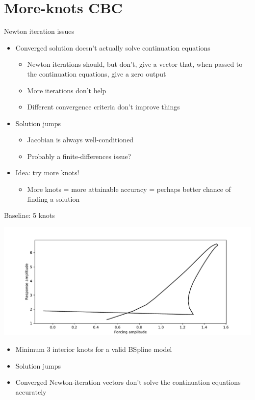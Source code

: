 \documentclass[presentation]{beamer}
\begin{document}
\section{More-knots CBC}
\label{sec:orgee4e00c}
\begin{frame}[label={sec:org18b7fbc}]{Newton iteration issues}
\begin{itemize}
\item Converged solution doesn't actually solve continuation equations
\begin{itemize}
\item Newton iterations should, but don't, give a vector that, when passed to the continuation equations, give a zero output
\item More iterations don't help
\item Different convergence criteria don't improve things
\end{itemize}
\end{itemize}
\vfill
\begin{itemize}
\item Solution jumps
\begin{itemize}
\item Jacobian is always well-conditioned
\item Probably a finite-differences issue?
\end{itemize}
\end{itemize}
\vfill
\begin{itemize}
\item Idea: try more knots!
\begin{itemize}
\item More knots = more attainable accuracy = perhaps better chance of finding a solution
\end{itemize}
\end{itemize}
\end{frame}

\begin{frame}[label={sec:orgc29e5cb},plain]{Baseline: 5 knots}
\begin{center}
\includegraphics[width=.9\linewidth]{./5_knots_cbc.pdf}
\end{center}

\begin{itemize}
\item Minimum 3 interior knots for a valid BSpline model
\item Solution jumps
\item Converged Newton-iteration vectors don't solve the continuation equations accurately
\end{itemize}
\end{frame}
\end{document}
